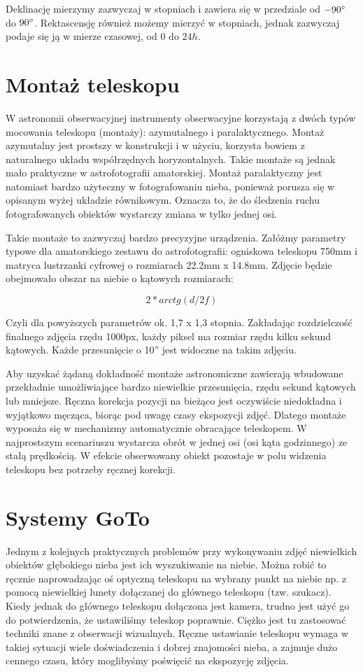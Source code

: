 Deklinację mierzymy zazwyczaj w stopniach i zawiera się w przedziale od
$-90\degree$ do $90\degree$. Rektascensję również możemy mierzyć w stopniach,
jednak zazwyczaj podaje się ją w mierze czasowej, od $0$ do $24h$.

\section{Montaż teleskopu}

W astronomii obserwacyjnej instrumenty obserwacyjne korzystają z dwóch typów
mocowania teleskopu (montaży): azymutalnego i paralaktycznego. Montaż azymutalny
jest prostszy w konstrukcji i w użyciu, korzysta bowiem z naturalnego układu
współrzędnych horyzontalnych. Takie montaże są jednak mało praktyczne
w astrofotografii amatorskiej. Montaż paralaktyczny jest natomiast bardzo
użyteczny w fotografowaniu nieba, ponieważ porusza się w opisanym wyżej układzie
równikowym. Oznacza to, że do śledzenia ruchu fotografowanych obiektów wystarczy
zmiana w tylko jednej osi. 

Takie montaże to zazwyczaj bardzo precyzyjne urządzenia. Załóżmy parametry
typowe dla amatorskiego zestawu do astrofotografii: ogniskowa teleskopu 750mm
i matryca lustrzanki cyfrowej o rozmiarach 22.2mm x 14.8mm. Zdjęcie będzie
obejmowało obszar na niebie o kątowych rozmiarach:

$$2*arc tg(d/2f)$$

Czyli dla powyższych parametrów ok. 1,7 x 1,3 stopnia. Zakładając rozdzielczość
finalnego zdjęcia rzędu 1000px, każdy piksel ma rozmiar rzędu kilku sekund
kątowych. Każde przesunięcie o 10'' jest widoczne na takim zdjęciu.

Aby uzyskać żądaną dokładność montaże astronomiczne zawierają wbudowane
przekładnie umożliwiające bardzo niewielkie przesunięcia, rzędu sekund
kątowych lub mniejsze. Ręczna korekcja pozycji na bieżąco jest oczywiście
niedokładna i wyjątkowo męcząca, biorąc pod uwagę czasy ekspozycji zdjęć.
Dlatego montaże wyposaża się w mechanizmy automatycznie obracające teleskopem.
W najprostszym scenariuszu wystarcza obrót w jednej osi (osi kąta godzinnego) ze
stałą prędkością. W efekcie obserwowany obiekt pozostaje w polu widzenia
teleskopu bez potrzeby ręcznej korekcji.

\section{Systemy GoTo}

Jednym z kolejnych praktycznych problemów przy wykonywaniu zdjęć niewielkich
obiektów głębokiego nieba jest ich wyszukiwanie na niebie. Można robić to
ręcznie naprowadzając oś optyczną teleskopu na wybrany punkt na niebie np.
z pomocą niewielkiej lunety dołączanej do głównego teleskopu (tzw. szukacz).
Kiedy jednak do głównego teleskopu dołączona jest kamera, trudno jest użyć go do
potwierdzenia, że ustawiliśmy teleskop poprawnie. Ciężko jest tu zastosować
techniki znane z obserwacji wizualnych.  Ręczne ustawianie teleskopu wymaga
w takiej sytuacji wiele doświadczenia i dobrej znajomości nieba, a zajmuje dużo
cennego czasu, który moglibyśmy poświęcić na ekspozycję zdjęcia.

